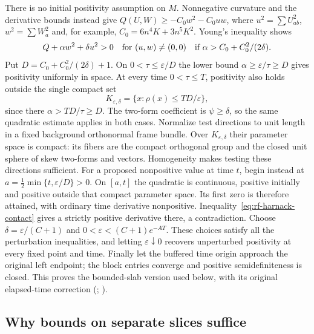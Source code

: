 There is no initial positivity assumption on $M$.  Nonnegative
curvature and the derivative bounds instead give
$Q(U,W)\geq-C_0w^2-C_0uw$, where
$u^2=\sum U_{ab}^2$, $w^2=\sum W_a^2$ and, for example,
$C_0=6n^4K+3n^5K^2$.  Young's inequality shows
\[
 Q+\alpha w^2+\delta u^2>0\quad\hbox{for }(u,w)\ne(0,0)
 \quad\hbox{if }\alpha>C_0+C_0^2/(2\delta).
\]
Put $D=C_0+C_0^2/(2\delta)+1$.  On
$0<\tau\leq\varepsilon/D$ the lower bound
$\alpha\geq\varepsilon/\tau\geq D$ gives positivity uniformly in
space.  At every time $0<\tau\leq T$, positivity also holds outside
the single compact set
\[
 K_{\varepsilon,\delta}=\{x:\rho(x)\leq TD/\varepsilon\},
\]
since there $\alpha>TD/\tau\geq D$.  The two-form coefficient is
$\psi\geq\delta$, so the same quadratic estimate applies in both
cases.  Normalize test directions to unit length in a fixed
background orthonormal frame bundle.  Over $K_{\varepsilon,\delta}$
their parameter space is compact: its fibers are the compact
orthogonal group and the closed unit sphere of skew two-forms and
vectors.  Homogeneity makes testing these directions sufficient.
For a proposed nonpositive value at time $t$, begin instead at
$a=\tfrac12\min\{t,\varepsilon/D\}>0$.  On $[a,t]$ the quadratic
is continuous, positive initially and positive outside that compact
parameter space.  Its first zero is therefore attained, with ordinary
time derivative nonpositive.
Inequality~\eqref{eq:rf-harnack-contact} gives a strictly positive
derivative there, a contradiction.  Choose
$\delta=\varepsilon/(C+1)$ and
$0<\varepsilon<(C+1)e^{-AT}$.  These choices satisfy all the
perturbation inequalities, and letting $\varepsilon\downarrow0$
recovers unperturbed positivity at every fixed point and time.
Finally let the buffered time origin
approach the original left endpoint; the block entries converge and
positive semidefiniteness is closed.  This proves the bounded-slab
version used below, with its original elapsed-time correction
(\cite[Theorem 4.37 and Corollary 4.39, p.~81]{MT2007};
\cite[Theorem 15.16, pp.~272--279; Lemma 15.23, p.~283;
Section 15.4.5, p.~287]{ChowEtAl2008}).

\subsection{Why bounds on separate slices suffice}

